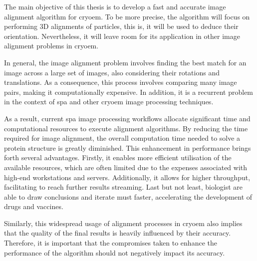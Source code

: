 \documentclass[../main.tex]{subfiles}
\begin{document}
The main objective of this thesis is to develop a fast and accurate image alignment algorithm for \gls{cryoem}. To be more precise, the algorithm will focus on performing 3D alignments of particles, this is, it will be used to deduce their orientation. Nevertheless, it will leave room for its application in other image alignment problems in \gls{cryoem}.

In general, the image alignment problem involves finding the best match for an image across a large set of images, also considering their rotations and translations. As a consequence, this process involves comparing many image pairs, making it computationally expensive. In addition, it is a recurrent problem in the context of \gls{spa} and other \gls{cryoem} image processing techniques.

As a result, current \gls{spa} image processing workflows allocate significant time and computational resources to execute alignment algorithms. By reducing the time required for image alignment, the overall computation time needed to solve a protein structure is greatly diminished. This enhancement in performance brings forth several advantages. Firstly, it enables more efficient utilisation of the available resources, which are often limited due to the expenses associated with high-end workstations and servers. Additionally, it allows for higher throughput, facilitating to reach further results streaming. Last but not least, biologist are able to draw conclusions and iterate must faster, accelerating the development of drugs and vaccines.

Similarly, this widespread usage of alignment processes in \gls{cryoem} also implies that the quality of the final results is heavily influenced by their accuracy. Therefore, it is important that the compromises taken to enhance the performance of the algorithm should not negatively impact its accuracy.
\end{document}
